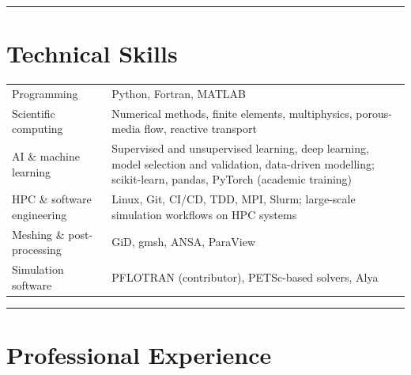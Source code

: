 \documentclass[10pt,a4paper]{article}
\newcommand{\ruledsection}[1]{%
  \par\vspace{3pt}%
  {\color{hair}\rule{\textwidth}{0.6pt}}%
  \vspace{-3pt}%
  \section{#1}%
}
\begin{document}
\ruledsection{Technical Skills}
\begin{tabularx}{\textwidth}{@{}>{\sffamily\fontsize{8.8}{10.8}\selectfont\color{muted}}l@{\hspace{0.55cm}}>{\raggedright\arraybackslash}X@{}}
  
  
Programming                 & Python, Fortran, MATLAB \\[1.5pt]
Scientific computing        & Numerical methods, finite elements, multiphysics, porous-media flow, reactive transport \\[1.5pt]
AI \& machine learning      & Supervised and unsupervised learning, deep learning, model selection and validation, data-driven modelling; scikit-learn, pandas, PyTorch (academic training) \\[1.5pt]
HPC \& software engineering & Linux, Git, CI/CD, TDD, MPI, Slurm; large-scale simulation workflows on HPC systems \\[1.5pt]
Meshing \& post-processing  & GiD, gmsh, ANSA, ParaView \\[1.5pt]
Simulation software         & PFLOTRAN (contributor), PETSc-based solvers, Alya \\
  
\end{tabularx}

\ruledsection{Professional Experience}
\vspace{-5.5pt}
\end{document}
